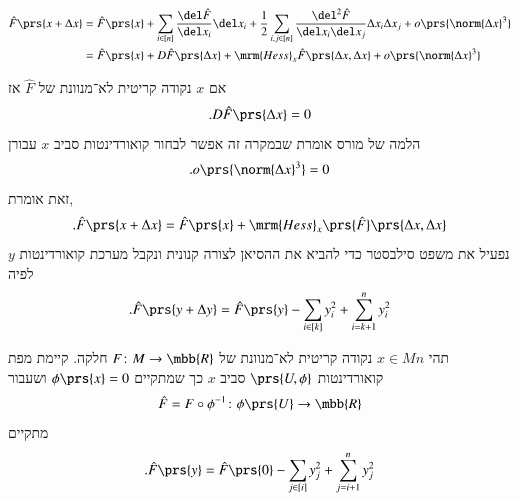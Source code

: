 \documentclass[a4paper,10pt,twoside,openany]{book}
\begin{document}
\begin{align*}
\hat{F}\prs{x+\Delta x} &= \hat{F}\prs{x} + \sum_{i \in [n]} \frac{\del \hat{F}}{\del x_i} \del x_i + \frac{1}{2} \sum_{i,j \in [n]} \frac{\del^2 \hat{F}}{\del x_i \del x_j} \Delta x_i \Delta x_j + o\prs{\norm{\Delta x}^3}
\\&=
\hat{F}\prs{x} + D \hat{F}\prs{\Delta x} + \mrm{Hess}_x\hat{F}\prs{\Delta x, \Delta x} + o\prs{\norm{\Delta x}^3}
\end{align*}

אם
$x$
נקודה קריטית לא־מנוונת של
$\hat{F}$
אז
\begin{align*}
\text{.} D \hat{F}\prs{\Delta x} = 0
\end{align*}
הלמה של מורס אומרת שבמקרה זה אפשר לבחור קואורדינטות סביב
$x$
עבורן
\[\text{.} o\prs{\norm{\Delta x}^3} = 0\]
זאת אומרת,
\[\text{.} \hat{F}\prs{x + \Delta x} = \hat{F}\prs{x} + \mrm{Hess}_x\prs{\hat{F}} \prs{\Delta x, \Delta x}\]
נפעיל את משפט סילבסטר כדי להביא את ההסיאן לצורה קנונית ונקבל מערכת קואורדינטות
$y$
לפיה
\begin{align*}
\text{.} \hat{F}\prs{y + \Delta y} = \hat{F}\prs{y} - \sum_{i \in [k]} y_i^2 + \sum_{i = k+1}^n y_i^2
\end{align*}

\begin{theorem}
תהי
$x \in Mn$
נקודה קריטית לא־מנוונת של
$F \colon M \to \mbb{R}$
חלקה.
קיימת מפת קואורדינטות
$\prs{U,\phi}$
סביב
$x$
כך שמתקיים
$\phi\prs{x} = 0$
ושעבור
\[\hat{F} = F \circ \phi^{-1} \colon \phi\prs{U} \to \mbb{R}\]
מתקיים
\begin{align*}
\text{.} \hat{F}\prs{y} = \hat{F}\prs{0} - \sum_{j \in [i]} y_j^2 + \sum_{j = i+1}^n y_j^2
\end{align*}
\end{theorem}
\end{document}
